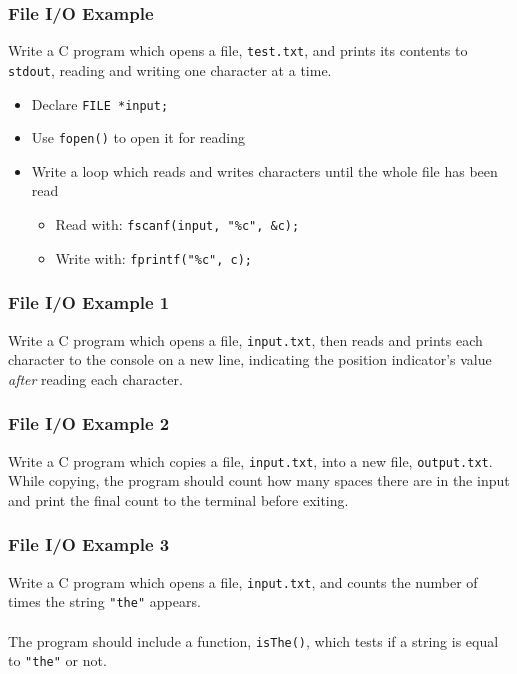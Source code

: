 \documentclass[14pt]{beamer}
\begin{document}
\begin{frame}
\frametitle{File I/O Example}
Write a C program which opens a file, \texttt{test.txt}, and prints its contents to \texttt{stdout}, reading and writing one character at a time.
\begin{itemize}
\pause
\item Declare \texttt{FILE *input;}
\pause
\item Use \texttt{fopen()} to open it for reading
\pause
\item Write a loop which reads and writes characters until the whole file has been read
	\begin{itemize}
		\item Read with: \texttt{fscanf(input, "\%c", \&c);}
		\item Write with: \texttt{fprintf("\%c", c);}
	\end{itemize}
\end{itemize}
\end{frame}

\begin{frame}
\frametitle{File I/O Example 1}
Write a C program which opens a file, \texttt{input.txt}, then reads and prints each character to the console on a new line, indicating the position indicator's value \textit{after} reading each character.
\end{frame}

\begin{frame}
\frametitle{File I/O Example 2}
Write a C program which copies a file, \texttt{input.txt}, into a new file, \texttt{output.txt}. While copying, the program should count how many spaces there are in the input and print the final count to the terminal before exiting.
\end{frame}

\begin{frame}
\frametitle{File I/O Example 3}
Write a C program which opens a file, \texttt{input.txt}, and counts the number of times the string \texttt{"the"} appears.
\\~\\
The program should include a function, \texttt{isThe()}, which tests if a string is equal to \texttt{"the"} or not.
\end{frame}
\end{document}
